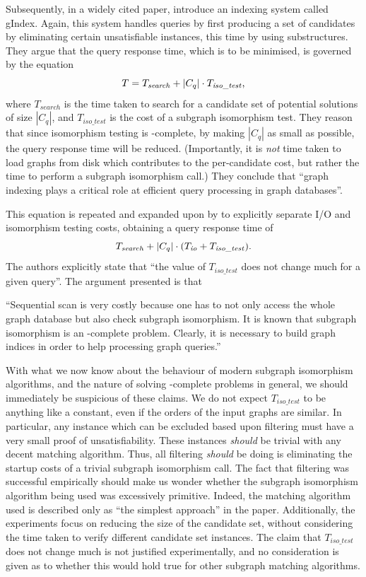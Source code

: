\documentclass[twoside,11pt]{article}
\newcommand{\citet}[1]{\citeA{#1}}
\begin{document}
Subsequently, in a widely cited paper, \citet{DBLP:conf/sigmod/YanYH04} introduce an indexing system
called gIndex. Again, this system handles queries by first producing a set of candidates by
eliminating certain unsatisfiable instances, this time by using substructures. They argue that the
query response time, which is to be minimised, is governed by the equation \[ T =
T_{\mathit{search}} + \left|C_q\right| \cdot T_{\mathit{iso\_test}} \textnormal{,}\] where
$T_{\mathit{search}}$ is the time taken to search for a candidate set of potential solutions of size
$\left|C_q\right|$, and $T_{\mathit{iso\_test}}$ is the cost of a subgraph isomorphism test. They
reason that since isomorphism testing is \NP-complete, by making $\left|C_q\right|$ as small as
possible, the query response time will be reduced.  (Importantly, it is \emph{not} time taken to
load graphs from disk which contributes to the per-candidate cost, but rather the time to perform a
subgraph isomorphism call.) They conclude that ``graph indexing plays a critical role at efficient
query processing in graph databases''.

This equation is repeated and expanded upon by \citet{DBLP:journals/tods/YanYH05} to explicitly
separate I/O and isomorphism testing costs, obtaining a query response time of \[
    T_{\mathit{search}} + \left|C_q\right| \cdot (T_{\mathit{io}} + T_{\mathit{iso\_test}})
    \textnormal{.} \] The authors explicitly state that ``the value of $T_{\mathit{iso\_test}}$ does
not change much for a given query''. The argument presented is that
\begin{displayquote}``Sequential scan is very costly
because one has to not only access the whole graph database but also check subgraph isomorphism. It
is known that subgraph isomorphism is an \NP-complete problem. Clearly, it is necessary to build
graph indices in order to help processing graph queries.''\end{displayquote}
With what we now know about the behaviour of modern subgraph isomorphism algorithms, and the nature
of solving \NP-complete problems in general, we should immediately be suspicious of these claims. We
do not expect $T_{\mathit{iso\_test}}$ to be anything like a constant, even if the orders of the
input graphs are similar. In particular, any instance which can be excluded based upon filtering
must have a very small proof of unsatisfiability. These instances \emph{should} be trivial with any
decent matching algorithm. Thus, all filtering \emph{should} be doing is eliminating the startup
costs of a trivial subgraph isomorphism call. The fact that filtering was successful empirically
should make us wonder whether the subgraph isomorphism algorithm being used was excessively
primitive. Indeed, the matching algorithm used is described only as ``the simplest approach'' in the
paper.  Additionally, the experiments focus on reducing the size of the candidate set, without
considering the time taken to verify different candidate set instances.  The claim that
$T_{\mathit{iso\_test}}$ does not change much is not justified experimentally, and no consideration
is given as to whether this would hold true for other subgraph matching algorithms.
\end{document}
